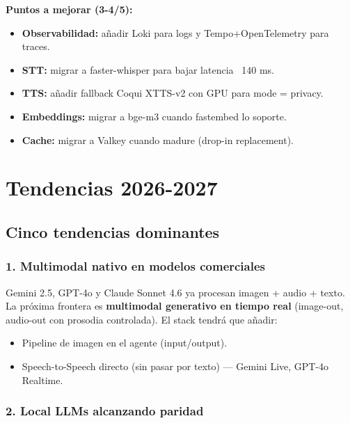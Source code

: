 \documentclass[11pt,a4paper]{article}
\begin{document}
\textbf{Puntos a mejorar (3-4/5):}
\begin{itemize}[leftmargin=*,itemsep=1pt]
\item \textbf{Observabilidad:} añadir Loki para logs y Tempo+OpenTelemetry para traces.
\item \textbf{STT:} migrar a faster-whisper para bajar latencia ~140 ms.
\item \textbf{TTS:} añadir fallback Coqui XTTS-v2 con GPU para mode = privacy.
\item \textbf{Embeddings:} migrar a bge-m3 cuando fastembed lo soporte.
\item \textbf{Cache:} migrar a Valkey cuando madure (drop-in replacement).
\end{itemize}

\newpage

\section{Tendencias 2026-2027}

\subsection{Cinco tendencias dominantes}

\subsubsection{1. Multimodal nativo en modelos comerciales}

Gemini 2.5, GPT-4o y Claude Sonnet 4.6 ya procesan imagen + audio + texto. La próxima frontera es \textbf{multimodal generativo en tiempo real} (image-out, audio-out con prosodia controlada). El stack tendrá que añadir:

\begin{itemize}[leftmargin=*,itemsep=1pt]
\item Pipeline de imagen en el agente (input/output).
\item Speech-to-Speech directo (sin pasar por texto) — Gemini Live, GPT-4o Realtime.
\end{itemize}

\subsubsection{2. Local LLMs alcanzando paridad}
\end{document}
